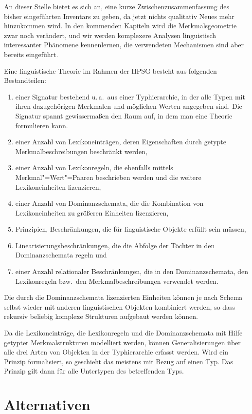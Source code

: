 An dieser Stelle bietet es sich an, eine kurze Zwischenzusammenfassung des bisher eingeführten
Inventars zu geben, da jetzt nichts qualitativ Neues mehr hinzukommen wird. In den kommenden
Kapiteln wird die Merkmalsgeometrie zwar noch verändert, und wir werden komplexere Analysen
linguistisch interessanter Phänomene kennenlernen, die verwendeten Mechanismen sind aber
bereits eingeführt. 

Eine linguistische Theorie im Rahmen der HPSG besteht aus folgenden Bestandteilen:
\begin{enumerate}
\item einer Signatur bestehend u.\,a.\ aus einer Typhierarchie, in der alle Typen mit ihren dazugehörigen
  Merkmalen und möglichen Werten angegeben sind. Die Signatur spannt gewissermaßen den Raum auf, in
  dem man eine Theorie formulieren kann.
\item einer Anzahl von Lexikoneinträgen, deren Eigenschaften durch getypte Merkmalbeschreibungen beschränkt werden,
\item einer Anzahl von Lexikonregeln, die ebenfalls mittels Merkmal"=Wert"=Paaren beschrieben werden und
      die weitere Lexikoneinheiten lizenzieren,
\item einer Anzahl von Dominanzschemata, die die Kombination von Lexikoneinheiten zu größeren Einheiten
      lizenzieren,
\item Prinzipien, \dash Beschränkungen, die für linguistische Objekte erfüllt sein müssen,
\item Linearisierungsbeschränkungen, die die Abfolge der Töchter in den Dominanzschemata regeln und
\item einer Anzahl relationaler Beschränkungen, die in den Dominanzschemata, den Lexikonregeln bzw.\
      den Merkmalbeschreibungen verwendet werden.
\end{enumerate}
Die durch die Dominanzschemata lizenzierten Einheiten können je nach Schema
selbst wieder mit anderen linguistischen Objekten kombiniert
werden, so dass rekursiv beliebig komplexe Strukturen aufgebaut werden können.

Da die Lexikoneinträge, die Lexikonregeln und die Dominanzschemata mit Hilfe getypter Merkmalstrukturen
modelliert werden, können Generalisierungen über alle drei Arten von Objekten in der Typhierarchie
erfasst werden. Wird ein Prinzip formalisiert, so geschieht das meistens mit Bezug auf einen Typ. Das Prinzip
gilt dann für alle Untertypen des betreffenden Typs.


\section{Alternativen}

